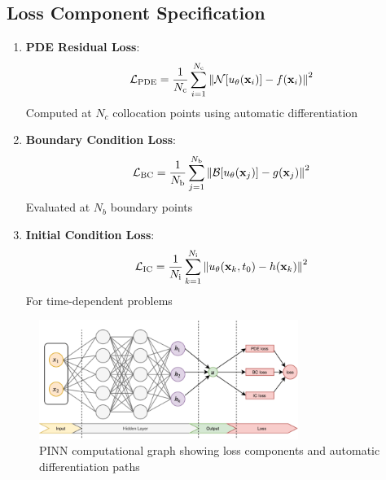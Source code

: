 \documentclass[12pt]{article}
\begin{document}
\subsection{Loss Component Specification}
\begin{enumerate}
    \item \textbf{PDE Residual Loss}:
    \begin{equation}
    \mathcal{L}_{\text{PDE}} = \frac{1}{N_{\text{c}}} \sum_{i=1}^{N_{\text{c}}} \norm{\mathcal{N}[u_{\theta}(\mathbf{x}_i)] - f(\mathbf{x}_i)}^2
    \label{eq:pde_loss}
    \end{equation}
    Computed at $N_c$ collocation points using automatic differentiation
    
    \item \textbf{Boundary Condition Loss}:
    \begin{equation}
    \mathcal{L}_{\text{BC}} = \frac{1}{N_{\text{b}}} \sum_{j=1}^{N_{\text{b}}} \norm{\mathcal{B}[u_{\theta}(\mathbf{x}_j)] - g(\mathbf{x}_j)}^2
    \label{eq:bc_loss}
    \end{equation}
    Evaluated at $N_b$ boundary points
    
    \item \textbf{Initial Condition Loss}:
    \begin{equation}
    \mathcal{L}_{\text{IC}} = \frac{1}{N_{\text{i}}} \sum_{k=1}^{N_{\text{i}}} \norm{u_{\theta}(\mathbf{x}_k, t_0) - h(\mathbf{x}_k)}^2
    \label{eq:ic_loss}
    \end{equation}
    For time-dependent problems
\end{enumerate}

\begin{figure}[htbp]
    \centering
    \includegraphics[width=0.75\textwidth]{fig.png}
    \caption{PINN computational graph showing loss components and automatic differentiation paths}
    \label{fig:pinn_arch}
\end{figure}
\end{document}
